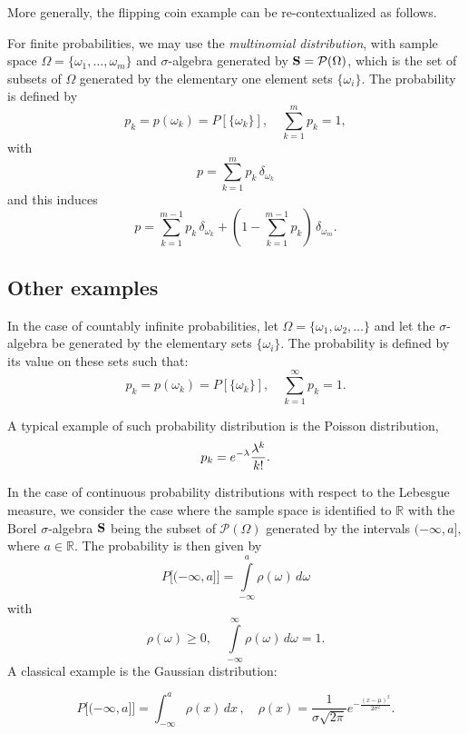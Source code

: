 More generally, the flipping coin example can be re-contextualized as follows. 
\begin{example}
For finite probabilities, we may use the \emph{multinomial distribution},  with sample space $\Omega=
\{\omega_1,\dots,\omega_m\}$ and $\sigma$-algebra generated by ${\mathbf{S}}=
{\mathcal P}(\Omega)$, which is the set of subsets of $\Omega$ generated by the
elementary one element sets $\{\omega_i\}$. The probability is defined by 
\begin{equation}
 p_k=p(\omega_k)=P[\{\omega_k\}],\quad \sum\limits_{k=1}^m p_k=1,
\end{equation}
with
\[ p=\sum\limits_{k=1}^m
p_k\,\delta_{\omega_k}\]
and this induces \begin{equation}
p=\sum\limits_{k=1}^{m-1}p_k\,\delta_{\omega_k}
 +(1-\sum\limits_{k=1}^{m-1} p_k)\,\delta_{\omega_m}.
\end{equation}

\end{example}


\subsection{Other examples}
\begin{example}
    In the case of countably infinite probabilities, let 
$\Omega=\{\omega_1,\omega_2,\dots\}$ and let the $\sigma$-algebra be generated
by the elementary sets $\{\omega_i\}$. The probability is defined by
its value on these sets such that:
\begin{equation}
 p_k=p(\omega_k)=P[\{\omega_k\}],\quad \sum\limits_{k=1}^\infty p_k=1.
\end{equation}

A typical example of such probability distribution is the Poisson
distribution,
\begin{equation}
p_k= e^{-\lambda}{\lambda^k\over k!}.
\end{equation}


 In the case of continuous probability distributions with respect to the Lebesgue measure, we consider the case where the sample space is identified to 
$\mathbb{R}$ with the Borel
$\sigma$-algebra ${\mathbf{S}}$ being the subset of ${\mathcal P}(\Omega)$
generated by the intervals $(-\infty,a],$ where $ a\in {\mathbb R}$. The
probability is then given by 
\begin{equation}
P\big[ (-\infty,
a]\big] = \int\limits_{-\infty}^a
\rho(\omega)\, d\omega 
\end{equation}
with
\[\rho(\omega)\geq 0,\quad \int\limits_{-\infty}^\infty
\rho(\omega)\, d\omega =1.\]
A classical example is the Gaussian distribution: 

\begin{equation}
P\big[ (-\infty, a]\big]= \int_{-\infty}^a
\rho(x)\, dx\,,\quad
\rho(x) = \frac{1}{ \sigma\sqrt{2\pi}}
e^{-\displaystyle{\frac{(x-\mu)^2}{ 2\sigma^2}}}.
\end{equation}
\end{example}

